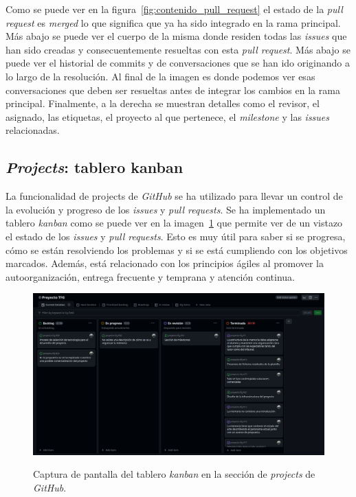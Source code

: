 Como se puede ver en la figura~\ref{fig:contenido_pull_request} el estado de la \textit{pull request} es \textit{merged} lo que significa que ya ha sido integrado en la rama principal. Más abajo se puede ver el cuerpo de la misma donde residen todas las \textit{issues} que han sido creadas y consecuentemente resueltas con esta \textit{pull request}. Más abajo se puede ver el historial de commits y de conversaciones que se han ido originando a lo largo de la resolución. Al final de la imagen es donde podemos ver esas conversaciones que deben ser resueltas antes de integrar los cambios en la rama principal. Finalmente, a la derecha se muestran detalles como el revisor, el asignado, las etiquetas, el proyecto al que pertenece, el \textit{milestone} y las \textit{issues} relacionadas.

\subsection{\textit{Projects}: tablero kanban}

La funcionalidad de projects de \textit{GitHub} se ha utilizado para llevar un control de la evolución y progreso de los \textit{issues} y \textit{pull requests}. Se ha implementado un tablero \textit{kanban} como se puede ver en la imagen~\ref{fig:tablero_kanban} que permite ver de un vistazo el estado de los \textit{issues} y \textit{pull requests}. Esto es muy útil para saber si se progresa, cómo se están resolviendo los problemas y si se está cumpliendo con los objetivos marcados. Además, está relacionado con los principios ágiles al promover la autoorganización, entrega frecuente y temprana y atención continua.

\begin{figure}[H]
    \caption{Captura de pantalla del tablero \textit{kanban} en la sección de \textit{projects} de \textit{GitHub}.}
    \centering
    \vspace*{0.5cm}
    \includegraphics[scale=0.2]{figuras/projects_github.png}\label{fig:tablero_kanban}
\end{figure}

